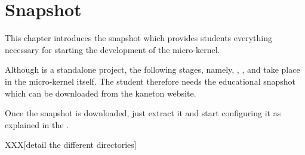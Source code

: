 %
%
%
%
%
%

%
%

\chapter{Snapshot}
\label{chapter:snapshot}

This chapter introduces the snapshot which provides students everything
necessary for starting the development of the  micro-kernel.

\newpage

%
%

Although  is a standalone project, the following stages, namely,
, ,  and  take place in the micro-kernel
itself. The student therefore needs the educational snapshot which can be
downloaded from the kaneton website.

Once the snapshot is downloaded, just extract it and start configuring it
as explained in the .

XXX[detail the different directories]

